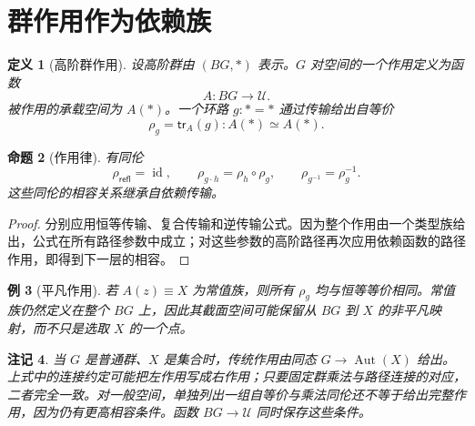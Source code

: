 \documentclass[12pt,oneside,openany,fontset=none]{ctexbook}
\theoremstyle{cn}
\newtheorem{definition}{定义}[chapter]
\newtheorem{example}[definition]{例}
\newtheorem{proposition}[definition]{命题}
\newtheorem{remark}[definition]{注记}
\numberwithin{equation}{chapter}
\newcommand{\U}{\mathcal U}
\newcommand{\id}{\operatorname{id}}
\newcommand{\refl}{\mathsf{refl}}
\newcommand{\tr}{\mathsf{tr}}
\newcommand{\Aut}{\operatorname{Aut}}
\begin{document}
\section{群作用作为依赖族}
\begin{definition}[高阶群作用]
设高阶群由 $(BG,*)$ 表示。$G$ 对空间的一个作用定义为函数
\[
A:BG\longrightarrow\U.
\]
被作用的承载空间为 $A(*)$。一个环路 $g:*=*$ 通过传输给出自等价
\[
\rho_g=\tr_A(g):A(*)\simeq A(*).
\]
\end{definition}
\begin{proposition}[作用律]
有同伦
\[
\rho_{\refl}=\id,
\qquad
\rho_{g\cdot h}=\rho_h\circ\rho_g,
\qquad
\rho_{g^{-1}}=\rho_g^{-1}.
\]
这些同伦的相容关系继承自依赖传输。
\end{proposition}
\begin{proof}
分别应用恒等传输、复合传输和逆传输公式。因为整个作用由一个类型族给出，公式在所有路径参数中成立；对这些参数的高阶路径再次应用依赖函数的路径作用，即得到下一层的相容。
\end{proof}
\begin{example}[平凡作用]
若 $A(z)\equiv X$ 为常值族，则所有 $\rho_g$ 均与恒等等价相同。常值族仍然定义在整个 $BG$ 上，因此其截面空间可能保留从 $BG$ 到 $X$ 的非平凡映射，而不只是选取 $X$ 的一个点。
\end{example}
\begin{remark}
当 $G$ 是普通群、$X$ 是集合时，传统作用由同态 $G\to\Aut(X)$ 给出。上式中的连接约定可能把左作用写成右作用；只要固定群乘法与路径连接的对应，二者完全一致。对一般空间，单独列出一组自等价与乘法同伦还不等于给出完整作用，因为仍有更高相容条件。函数 $BG\to\U$ 同时保存这些条件。
\end{remark}
\end{document}
